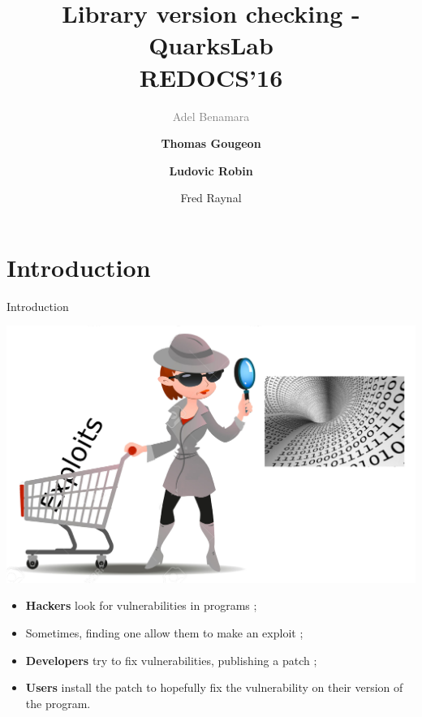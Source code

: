 \documentclass[11pt]{beamer}
\author{\textcolor{gray}{Adel Benamara} \and \textbf{Thomas Gougeon} \and \textbf{Ludovic
Robin} \\ \and Fred Raynal}
\title{Library version checking - QuarksLab \\ REDOCS'16}
\begin{document}
\begin{frame}
\titlepage
\end{frame}

\begin{frame}
\tableofcontents
\end{frame}



\section{Introduction}

\begin{frame}{Introduction}

    \begin{center}
    \includegraphics[scale=0.38]{hacker.png}
    \end{center}

    \begin{block}{}
        \begin{itemize}
            \item \textbf{Hackers} look for vulnerabilities in programs ;
            \item Sometimes, finding one allow them to make an exploit ;
            \item \textbf{Developers} try to fix vulnerabilities, publishing a patch ;
            \item \textbf{Users} install the patch to hopefully fix the vulnerability on
                their version of the program.
        \end{itemize}
    \end{block}
\end{frame}
\end{document}
